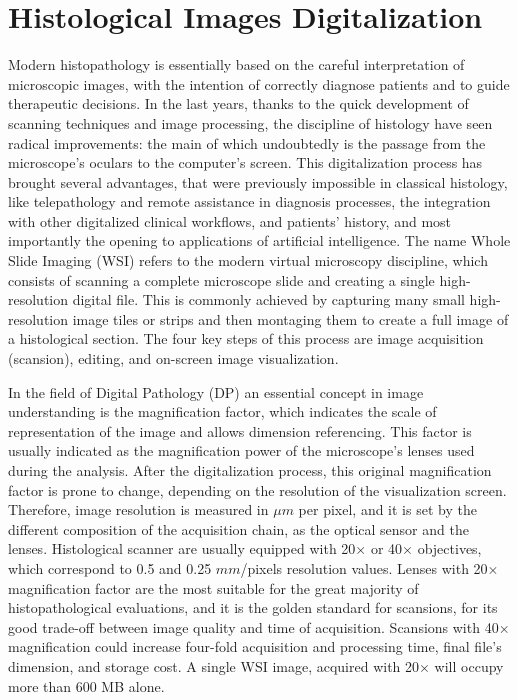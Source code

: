 \section{Histological Images Digitalization} \label{ssec:hist_im}
Modern histopathology is essentially based on the careful interpretation of microscopic images, with the intention of correctly diagnose patients and to guide therapeutic decisions. In the last years, thanks to the quick development of scanning techniques and image processing, the discipline of histology have seen radical improvements: the main of which undoubtedly is the passage from the microscope's oculars to the computer's screen. This digitalization process has brought several advantages, that were previously impossible in classical histology, like telepathology and remote assistance in diagnosis processes, the integration with other digitalized clinical workflows, and patients' history, and most importantly the opening to applications of artificial intelligence.
The name Whole Slide Imaging (WSI) refers to the modern virtual microscopy discipline, which consists of scanning a complete microscope slide and creating a single high-resolution digital file. This is commonly achieved by capturing many small high-resolution image tiles or strips and then montaging them to create a full image of a histological section. The four key steps of this process are image acquisition (scansion), editing, and on-screen image visualization.

In the field of Digital Pathology (DP) an essential concept in image understanding is the magnification factor, which indicates the scale of representation of the image and allows dimension referencing. This factor is usually indicated as the magnification power of the microscope's lenses used during the analysis. After the digitalization process, this original magnification factor is prone to change, depending on the resolution of the visualization screen. Therefore, image resolution is measured in $\mu m$ per pixel, and it is set by the different composition of the acquisition chain, as the optical sensor and the lenses. Histological scanner are usually equipped with 20$\times$ or 40$\times$ objectives, which correspond to 0.5 and 0.25 $mm$/pixels resolution values. Lenses with 20$\times$ magnification factor are the most suitable for the great majority of histopathological evaluations, and it is the golden standard for scansions, for its good trade-off between image quality and time of acquisition. Scansions with 40$\times$ magnification could increase four-fold acquisition and processing time, final file's dimension, and storage cost. A single WSI image, acquired with 20$\times$ will occupy more than 600 MB alone.

